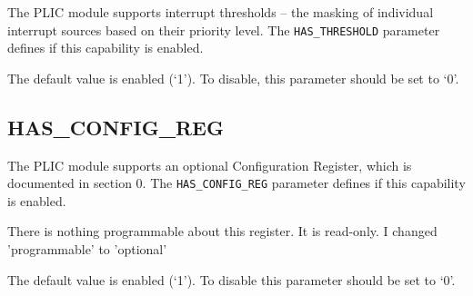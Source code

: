 The PLIC module supports interrupt thresholds -- the masking of
individual interrupt sources based on their priority level. The
\texttt{HAS\_THRESHOLD} parameter defines if this capability is enabled.

The default value is enabled (`1'). To disable, this parameter should be
set to `0'.

\subsection{HAS\_CONFIG\_REG}

The PLIC module supports an optional Configuration Register, which is
documented in section 0. The \texttt{HAS\_CONFIG\_REG} parameter defines
if this capability is enabled.

\comment
There is nothing programmable about this register. It is read-only.
I changed 'programmable' to 'optional'
\endcomment

The default value is enabled (`1'). To disable this parameter should be
set to `0'.
